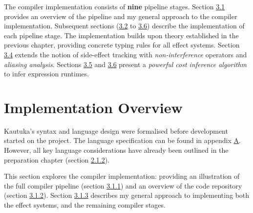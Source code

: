 




\vspace{-1mm}

%
%

\label{sec:3}

The compiler implementation consists of \textbf{nine} pipeline stages. Section \hyperref[sec:3.1]{3.1} provides an overview of the pipeline and my general approach to the compiler implementation. Subsequent sections (\hyperref[sec:3.2]{3.2} to \hyperref[sec:3.6]{3.6}) describe the implementation of each pipeline stage. The implementation builds upon theory established in the previous chapter, providing concrete typing rules for all effect systems. Section \hyperref[sec:3.4]{3.4} extends the notion of side-effect tracking with \textit{non-interference} operators and \textit{aliasing analysis}. Sections \hyperref[sec:3.5]{3.5} and \hyperref[sec:3.6]{3.6} present a \textit{powerful cost inference algorithm} to infer expression runtimes.

\vspace{-2mm}

\section{Implementation Overview}

\label{sec:3.1}

\vspace{-1mm}

Kautuka's syntax and language design were formalised before development started on the project. The language specification can be found in appendix \hyperref[sec:A]{A}. However, all key language considerations have already been outlined in the preparation chapter (section \hyperref[sec:2.1.2]{2.1.2}).

This section explores the compiler implementation: providing an illustration of the full compiler pipeline (section \hyperref[sec:3.1.1]{3.1.1}) and an overview of the code repository (section \hyperref[sec:3.1.2]{3.1.2}). Section \hyperref[sec:3.1.3]{3.1.3} describes my general approach to implementing both the effect systems, and the remaining compiler stages.

